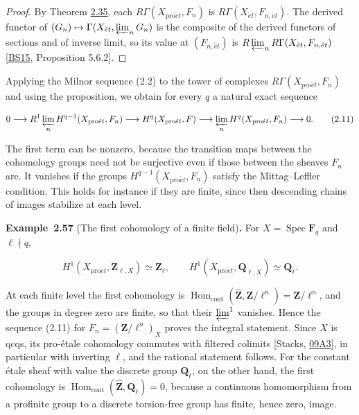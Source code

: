 \documentclass[11pt]{article}
\newenvironment{bpstatement}[2]{\par\addvspace{0.6\baselineskip}\noindent\textbf{#1}#2\textbf{.}\enspace\ignorespaces}
  {\par\addvspace{0.4\baselineskip}}
\begin{document}
\begin{proof}[{Proof}]\label{bp176}%
By Theorem \hyperref[bp103]{2.35}, each \(R\Gamma(X_{\mathrm{pro}\acute{e}t},F_n)\) is \(R\Gamma(X_{\acute{e}t},F_{n,\acute{e}t})\). The derived functor of \((G_n)\mapsto\Gamma(X_{\acute{e}t},\varprojlim_nG_n)\) is the composite of the derived functors of sections and of inverse limit, so its value at \((F_{n,\acute{e}t})\) is \(R\varprojlim_nR\Gamma(X_{\acute{e}t},F_{n,\acute{e}t})\) [\hyperref[bp705]{BS15}, Proposition 5.6.2].
\end{proof}

\label{bp177}%
Applying the Milnor sequence (2.2) to the tower of complexes \(R\Gamma(X_{\mathrm{pro}\acute{e}t},F_n)\) and using the proposition, we obtain for every \(q\) a natural exact sequence

\[
0\longrightarrow R^1\varprojlim_nH^{q-1}(X_{\mathrm{pro}\acute{e}t},F_n)
\longrightarrow H^q(X_{\mathrm{pro}\acute{e}t},F)
\longrightarrow\varprojlim_nH^q(X_{\mathrm{pro}\acute{e}t},F_n)
\longrightarrow0.
\tag{2.11}
\]

The first term can be nonzero, because the transition maps between the cohomology groups need not be surjective even if those between the sheaves \(F_n\) are. It vanishes if the groups \(H^{q-1}(X_{\mathrm{pro}\acute{e}t},F_n)\) satisfy the Mittag–Leffler condition. This holds for instance if they are finite, since then descending chains of images stabilize at each level.

\label{bp178}%
\begin{bpstatement}{Example~2.57}{ (The first cohomology of a finite field)}
For \(X=\operatorname{Spec}\mathbf F_q\) and \(\ell\nmid q\),

\[
H^1(X_{\mathrm{pro}\acute{e}t},\mathbf Z_{\ell,X})\simeq\mathbf Z_\ell,
\qquad H^1(X_{\mathrm{pro}\acute{e}t},\mathbf Q_{\ell,X})\simeq\mathbf Q_\ell.
\]

At each finite level the first cohomology is \(\operatorname{Hom}_{\mathrm{cont}}(\widehat{\mathbf Z},
\mathbf Z/\ell^n)=\mathbf Z/\ell^n\), and the groups in degree zero are finite, so that their \(\varprojlim^1\) vanishes. Hence the sequence (2.11) for \(F_n=(\mathbf Z/\ell^n)_X\) proves the integral statement. Since \(X\) is qcqs, its pro-étale cohomology commutes with filtered colimits [Stacks, \href{https://stacks.math.columbia.edu/tag/09A3}{09A3}], in particular with inverting \(\ell\), and the rational statement follows. For the constant étale sheaf with value the discrete group \(\mathbf Q_\ell\), on the other hand, the first cohomology is \(\operatorname{Hom}_{\mathrm{cont}}(\widehat{\mathbf Z},\mathbf Q_\ell)=0\), because a continuous homomorphism from a profinite group to a discrete torsion-free group has finite, hence zero, image.
\end{bpstatement}
\end{document}
